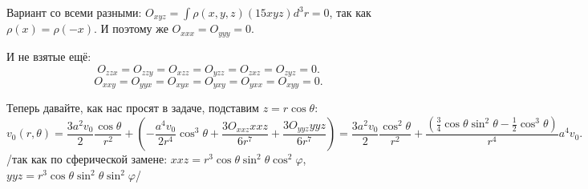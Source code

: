 Вариант со всеми разными: $O_{xyz} = \int \rho(x,y,z) (15 x y z) d^3 r = 0$, так как $\rho(x) = \rho(-x)$. И поэтому же $O_{xxx}=O_{yyy}=0$.

И не взятые ещё:
\begin{equation*}
	O_{z zx} = O_{zzy} = O_{xzz} = O_{yzz} = O_{zxz} = O_{zyz} = 0.
\end{equation*}
\begin{equation*}
	O_{xxy} = O_{yyx} = O_{xyx} = O_{yxy} = O_{yxx} = O_{xyy} = 0.
\end{equation*}

Теперь давайте, как нас просят в задаче, подставим $z = r \cos \theta$:
\begin{equation*}
	v_0(r,\theta) = \frac{3 a^2 v_0}{2} \frac{\cos \theta}{r^2} + \left(
	- \frac{a^4 v_0}{2 r^4} \cos^3 \theta + \frac{3 O_{xxz} xxz}{6 r^7} + \frac{3 O_{yyz}yyz}{6 r^7}
	\right) =
	\frac{3 a^2 v_0}{2} \frac{\cos^2 \theta}{r^2} + \frac{\left(\frac{3}{4} \cos\theta \sin^2 \theta - \frac{1}{2} \cos^3 \theta\right)}{r^4}a^4 v_0.
\end{equation*}
/так как по сферической замене: $xxz = r^3 \cos \theta \sin^2 \theta \cos^2 \varphi$, $yyz = r^3 \cos \theta \sin^2 \theta \sin^2 \varphi$/


